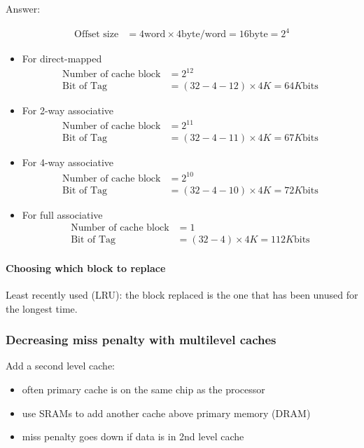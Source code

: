 Answer:{\small
    \begin{align*}
        \text{Offset size}&=4\text{word}\times 4\text{byte/word}=16\text{byte}=2^4
    \end{align*}
    \begin{itemize}
        \item For direct-mapped
        \begin{align*}
            \text{Number of cache block}&=2^{12}\\
            \text{Bit of Tag}&=(32-4-12)\times 4K=64K\text{bits}
        \end{align*}
        \item For 2-way associative
        \begin{align*}
            \text{Number of cache block}&=2^{11}\\
            \text{Bit of Tag}&=(32-4-11)\times 4K=67K\text{bits}
        \end{align*}
        \item For 4-way associative
        \begin{align*}
            \text{Number of cache block}&=2^{10}\\
            \text{Bit of Tag}&=(32-4-10)\times 4K=72K\text{bits}
        \end{align*}
        \item For full associative
        \begin{align*}
            \text{Number of cache block}&=1\\
            \text{Bit of Tag}&=(32-4)\times 4K=112K\text{bits}
        \end{align*}
    \end{itemize}
}

\paragraph{Choosing which block to replace}
Least recently used (LRU): the block replaced is the one that has been unused for the longest time.

\subsubsection{Decreasing miss penalty with multilevel caches}
Add a second level cache:
\begin{itemize}\small
    \item often primary cache is on the same chip as the processor
    \item use SRAMs to add another cache above primary memory (DRAM)
    \item miss penalty goes down if data is in 2nd level cache
\end{itemize}

